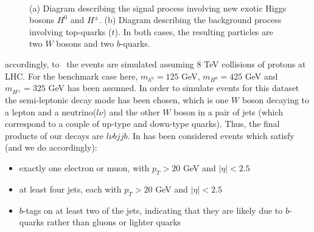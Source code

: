 \begin{figure}[htpb]
 \centering
  \quad
  \\
 \caption{(a) Diagram describing the signal process involving new exotic
  Higgs bosons $H^0$ and $H^\pm$. (b) Diagram describing the background
  process involving top-quarks ($t$). In both cases, the resulting
  particles are two $W$ bosons and two $b$-quarks.}
 \label{graphs}
\end{figure}

accordingly, to~\cite{paper} the events are simulated assuming $8$ TeV
collisions of protons at LHC. For the benchmark case here, $m_{h^0}=125$
GeV, $m_{H^0}=425$ GeV and $m_{H^\pm}=325$ GeV has been assumed.
In order to simulate events for this dataset the semi-leptonic decay mode has
been chosen, which is one $W$ boson decaying to a lepton and a
neutrino($l\nu$) and the other $W$ boson in a pair of jets (which
correspond to a couple of up-type and down-type quarks). Thus, the
final products of our decays are $l\nu b j j  b$.
In \cite{paper} has been considered events which satisfy (and we do
accordingly):
\begin{itemize}
 \item exactly one electron or muon, with $p_T > 20$ GeV and
       $\vert \eta \lvert < 2.5$
 \item at least four jets, each with $p_T > 20$ GeV and
       $\vert \eta \lvert < 2.5$
 \item $b$-tags on at least two of the jets, indicating that they are
       likely due to $b$-quarks rather than gluons or lighter quarks
\end{itemize}

